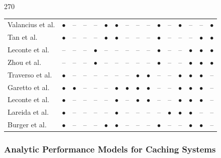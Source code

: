 \begin{table}
\begin{turn}{270}
\begin{tabular}{|l|ccccc|cc|cc|cc|cccc|}
    Valancius et al. \cite{valancius2009greening} & $\bullet$ & -- & -- & -- & $\bullet$ & $\bullet$ & -- & -- & -- & $\bullet$ & -- & $\bullet$ & -- & -- & $\bullet$ \\
    Tan et al. \cite{tan2013optimal} & $\bullet$ & -- & -- & -- & $\bullet$ & $\bullet$ & -- & -- & -- & $\bullet$ & -- & -- & -- & $\bullet$ & $\bullet$ \\
    Leconte et al. \cite{leconte2014adaptive} & -- & -- & -- & $\bullet$ & -- & -- & -- & -- & -- & $\bullet$ & -- & -- & $\bullet$ & $\bullet$ & $\bullet$ \\
    Zhou et al. \cite{zhou2015unifying} & -- & -- & -- & $\bullet$ & -- & -- & -- & -- & -- & $\bullet$ & -- & -- & $\bullet$ & $\bullet$ & $\bullet$ \\
    Traverso et al. \cite{traverso2013temporal} & $\bullet$ & -- & -- & -- & -- & -- & -- & $\bullet$ & $\bullet$ & -- & -- & $\bullet$ & $\bullet$ & $\bullet$ & -- \\
    Garetto et al. \cite{garetto2014dynamic} & $\bullet$ & $\bullet$ & -- & -- & -- & $\bullet$ & $\bullet$ & $\bullet$ & $\bullet$ & -- & -- & $\bullet$ & $\bullet$ & $\bullet$ & -- \\
    Leconte et al. \cite{leconte2016dynamic} & $\bullet$ & -- & -- & -- & -- & $\bullet$ & -- & $\bullet$ & $\bullet$ & -- & -- & $\bullet$ & $\bullet$ & $\bullet$ & -- \\ \hline
    Lareida et al. \cite{lareida2015augmenting} & $\bullet$ & -- & -- & -- & -- & $\bullet$ & -- & -- & -- & -- & $\bullet$ & $\bullet$ & $\bullet$ & -- & -- \\
    Burger et al. \cite{burger2016hierarchical} & $\bullet$ & -- & -- & -- & $\bullet$ & $\bullet$ & -- & -- & -- & $\bullet$ & -- & -- & $\bullet$ & $\bullet$ & -- \\
		\hline
	\end{tabular}%
\end{turn}
\end{table}

\subsubsection{Analytic Performance Models for Caching Systems}


